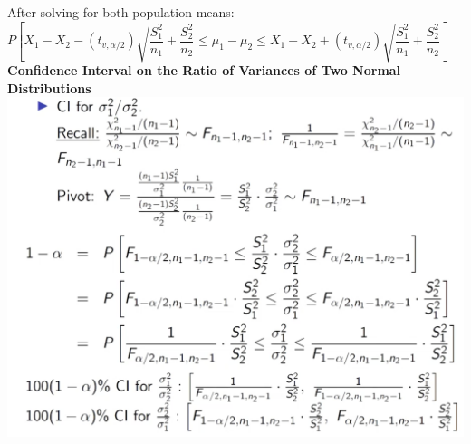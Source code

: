 \documentclass[]{article}
\begin{document}
\newline After solving for both population means:
\newline
\newline$P \left[ \bar{X}_1 - \bar{X}_2 - ( t_{v, \alpha / 2} )  \sqrt{\dfrac{S^2_1}{n_1} + \dfrac{S^2_2}{n_2}}  \le  \mu_1 - \mu_2 \le \bar{X}_1 - \bar{X}_2  + ( t_{v, \alpha /2} ) \sqrt{\dfrac{S^2_1}{n_1} + \dfrac{S^2_2}{n_2}}  \right]$
\newline 
\newline
\newline 
\newline
\newline 
\newline\Large\textbf{Confidence Interval on the Ratio of Variances of Two Normal Distributions}
\newline
\newline
\includegraphics[scale=0.8]{ratio_of_variances}
 
\section{}
\end{document}
